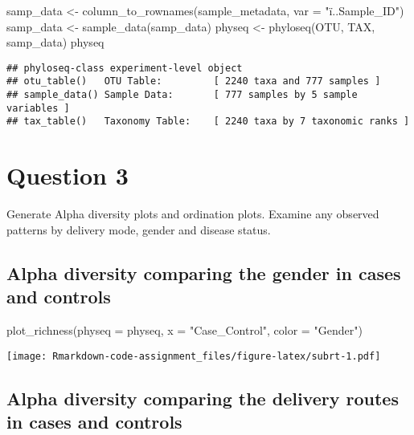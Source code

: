 \documentclass[
]{article}
\newenvironment{Shaded}{\begin{snugshade}}{\end{snugshade}}
\newcommand{\AttributeTok}[1]{\textcolor[rgb]{0.77,0.63,0.00}{#1}}
\newcommand{\FunctionTok}[1]{\textcolor[rgb]{0.00,0.00,0.00}{#1}}
\newcommand{\NormalTok}[1]{#1}
\newcommand{\OtherTok}[1]{\textcolor[rgb]{0.56,0.35,0.01}{#1}}
\newcommand{\StringTok}[1]{\textcolor[rgb]{0.31,0.60,0.02}{#1}}
\begin{document}
\begin{Shaded}
\begin{Highlighting}[]
\NormalTok{samp\_data }\OtherTok{\textless{}{-}} \FunctionTok{column\_to\_rownames}\NormalTok{(sample\_metadata, }\AttributeTok{var =} \StringTok{"ï..Sample\_ID"}\NormalTok{)}
\NormalTok{samp\_data }\OtherTok{\textless{}{-}} \FunctionTok{sample\_data}\NormalTok{(samp\_data)}
\NormalTok{physeq }\OtherTok{\textless{}{-}} \FunctionTok{phyloseq}\NormalTok{(OTU, TAX, samp\_data)}
\NormalTok{physeq}
\end{Highlighting}
\end{Shaded}

\begin{verbatim}
## phyloseq-class experiment-level object
## otu_table()   OTU Table:         [ 2240 taxa and 777 samples ]
## sample_data() Sample Data:       [ 777 samples by 5 sample variables ]
## tax_table()   Taxonomy Table:    [ 2240 taxa by 7 taxonomic ranks ]
\end{verbatim}

\hypertarget{question-3}{%
\section{Question 3}\label{question-3}}

Generate Alpha diversity plots and ordination plots. Examine any
observed patterns by delivery mode, gender and disease status.

\hypertarget{alpha-diversity-comparing-the-gender-in-cases-and-controls}{%
\subsection{Alpha diversity comparing the gender in cases and
controls}\label{alpha-diversity-comparing-the-gender-in-cases-and-controls}}

\begin{Shaded}
\begin{Highlighting}[]
\FunctionTok{plot\_richness}\NormalTok{(}\AttributeTok{physeq =}\NormalTok{ physeq, }\AttributeTok{x =} \StringTok{"Case\_Control"}\NormalTok{, }\AttributeTok{color =} \StringTok{"Gender"}\NormalTok{)}
\end{Highlighting}
\end{Shaded}

\texttt{[image: Rmarkdown-code-assignment\_files/figure-latex/subrt-1.pdf]}

\hypertarget{alpha-diversity-comparing-the-delivery-routes-in-cases-and-controls}{%
\subsection{Alpha diversity comparing the delivery routes in cases and
controls}\label{alpha-diversity-comparing-the-delivery-routes-in-cases-and-controls}}
\end{document}
